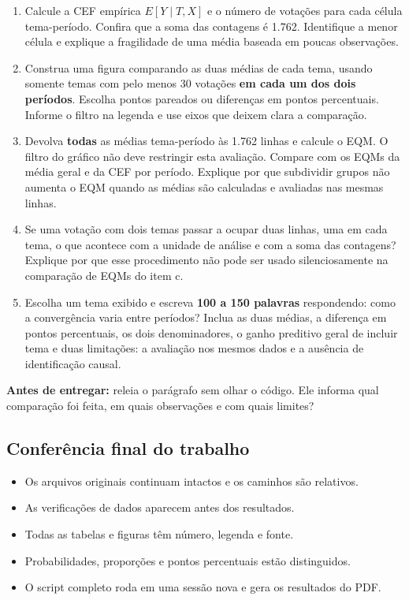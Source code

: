 \documentclass[
  brazilian,
  11pt,
  a4paper]{article}
\providecommand{\tightlist}{%
  \setlength{\itemsep}{0pt}\setlength{\parskip}{0pt}}
\begin{document}
\begin{enumerate}
\def\labelenumi{\alph{enumi}.}
\tightlist
\item
  Calcule a CEF empírica \(E[Y\mid T,X]\) e o número de votações para
  cada célula tema-período. Confira que a soma das contagens é 1.762.
  Identifique a menor célula e explique a fragilidade de uma média
  baseada em poucas observações.
\item
  Construa uma figura comparando as duas médias de cada tema, usando
  somente temas com pelo menos 30 votações \textbf{em cada um dos dois
  períodos}. Escolha pontos pareados ou diferenças em pontos
  percentuais. Informe o filtro na legenda e use eixos que deixem clara
  a comparação.
\item
  Devolva \textbf{todas} as médias tema-período às 1.762 linhas e
  calcule o EQM. O filtro do gráfico não deve restringir esta avaliação.
  Compare com os EQMs da média geral e da CEF por período. Explique por
  que subdividir grupos não aumenta o EQM quando as médias são
  calculadas e avaliadas nas mesmas linhas.
\item
  Se uma votação com dois temas passar a ocupar duas linhas, uma em cada
  tema, o que acontece com a unidade de análise e com a soma das
  contagens? Explique por que esse procedimento não pode ser usado
  silenciosamente na comparação de EQMs do item c.
\item
  Escolha um tema exibido e escreva \textbf{100 a 150 palavras}
  respondendo: como a convergência varia entre períodos? Inclua as duas
  médias, a diferença em pontos percentuais, os dois denominadores, o
  ganho preditivo geral de incluir tema e duas limitações: a avaliação
  nos mesmos dados e a ausência de identificação causal.
\end{enumerate}

\textbf{Antes de entregar:} releia o parágrafo sem olhar o código. Ele
informa qual comparação foi feita, em quais observações e com quais
limites?

\subsection{Conferência final do
trabalho}\label{conferuxeancia-final-do-trabalho}

\begin{itemize}
\tightlist
\item
  Os arquivos originais continuam intactos e os caminhos são relativos.
\item
  As verificações de dados aparecem antes dos resultados.
\item
  Todas as tabelas e figuras têm número, legenda e fonte.
\item
  Probabilidades, proporções e pontos percentuais estão distinguidos.
\item
  O script completo roda em uma sessão nova e gera os resultados do PDF.
\end{itemize}
\end{document}
